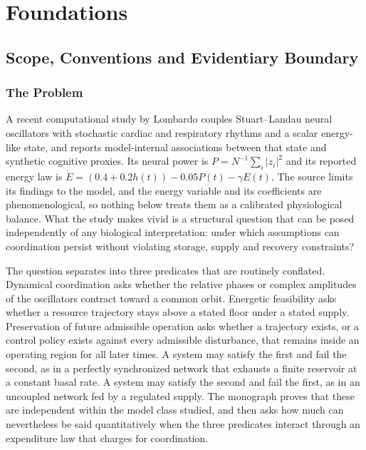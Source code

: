 \documentclass[11pt,notitlepage]{report}
\theoremstyle{definition}
\theoremstyle{remark}
\begin{document}
\part{Foundations}

\chapter{Scope, Conventions and Evidentiary Boundary}\label{ch:intro}

\section{The Problem}
A recent computational study by Lombardo \cite{lombardo2026} couples Stuart--Landau neural oscillators with stochastic cardiac and respiratory rhythms and a scalar energy-like state, and reports model-internal associations between that state and synthetic cognitive proxies. Its neural power is $P=N^{-1}\sum_i|z_i|^2$ and its reported energy law is $\dot E=(0.4+0.2h(t))-0.05P(t)-\gamma E(t)$. The source limits its findings to the model, and the energy variable and its coefficients are phenomenological, so nothing below treats them as a calibrated physiological balance. What the study makes vivid is a structural question that can be posed independently of any biological interpretation: under which assumptions can coordination persist without violating storage, supply and recovery constraints?

The question separates into three predicates that are routinely conflated. Dynamical coordination asks whether the relative phases or complex amplitudes of the oscillators contract toward a common orbit. Energetic feasibility asks whether a resource trajectory stays above a stated floor under a stated supply. Preservation of future admissible operation asks whether a trajectory exists, or a control policy exists against every admissible disturbance, that remains inside an operating region for all later times. A system may satisfy the first and fail the second, as in a perfectly synchronized network that exhausts a finite reservoir at a constant basal rate. A system may satisfy the second and fail the first, as in an uncoupled network fed by a regulated supply. The monograph proves that these are independent within the model class studied, and then asks how much can nevertheless be said quantitatively when the three predicates interact through an expenditure law that charges for coordination.
\end{document}
